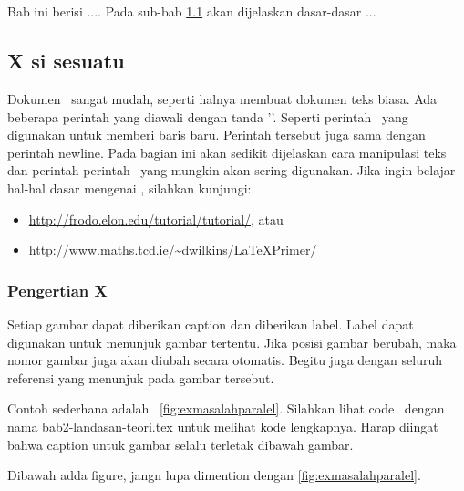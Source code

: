 \chapter{\babDua}
Bab ini berisi .... Pada sub-bab \ref{cha:kompar} akan dijelaskan dasar-dasar ...
\section{X si sesuatu}\label{cha:kompar}
Dokumen \latex~sangat mudah, seperti halnya membuat dokumen teks biasa. Ada beberapa perintah yang diawali dengan tanda '\bslash'. Seperti perintah \bslash\bslash~yang digunakan untuk memberi baris baru. 
Perintah tersebut juga sama dengan perintah \bslash newline. Pada bagian ini akan sedikit dijelaskan cara manipulasi teks dan perintah-perintah \latex~yang mungkin akan sering digunakan. 
Jika ingin belajar hal-hal dasar mengenai \latex, silahkan kunjungi: 
\begin{itemize}
	\item \url{http://frodo.elon.edu/tutorial/tutorial/}, atau
	\item \url{http://www.maths.tcd.ie/~dwilkins/LaTeXPrimer/}
\end{itemize}
\subsection{Pengertian X}
Setiap gambar dapat diberikan caption dan diberikan label. Label dapat digunakan untuk menunjuk gambar tertentu. Jika posisi gambar berubah, maka nomor gambar juga akan diubah secara 
otomatis. Begitu juga dengan seluruh referensi yang menunjuk pada gambar tersebut. 

Contoh sederhana adalah \pic~\ref{fig:exmasalahparalel}. Silahkan lihat code \latex~dengan nama bab2-landasan-teori.tex untuk melihat kode lengkapnya. Harap diingat bahwa caption untuk gambar selalu terletak dibawah gambar. 

Dibawah adda figure, jangn lupa dimention dengan \ref{fig:exmasalahparalel}. 

